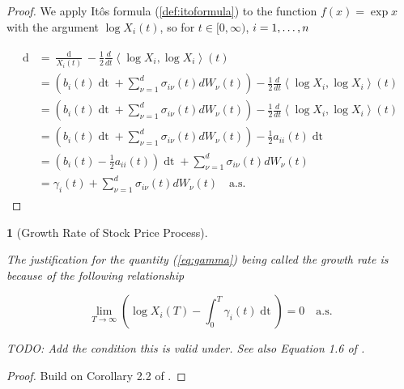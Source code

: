 \documentclass[british]{amsart}
\numberwithin{equation}{section}
\numberwithin{figure}{section}
\theoremstyle{plain}
\newtheorem{thm}{\protect\theoremname}[section]
\theoremstyle{definition}
\theoremstyle{plain}
\theoremstyle{plain}
\theoremstyle{plain}
\theoremstyle{remark}
\theoremstyle{plain}
\providecommand{\theoremname}{Theorem}
\renewcommand{\d}[1]{\mathop{\mathrm{d}{#1}}}
\newcommand{\ranget}{t\in[0,\infty)}
\newcommand{\almostsurely}{\text{a.s.}}
\begin{document}
\begin{proof}
	We apply It\^{o}s formula (\ref{def:itoformula}) to the function $f(x)=\exp{x}$ with the argument $\log{X_{i}(t)}$, so for $\ranget$, $i=1,\dots,n$

	\begin{gather*}
		\begin{split}
			\d{\log{X_{i}(t)}} 
			 	& = 
					\frac{\d{X_{i}(t)}}{X_{i}(t)} - 
						\frac{1}{2} \frac{d}{dt}\left\langle \log X_{i},\log X_{i}\right\rangle(t)
					\\
				& = 
					\left(
						b_{i}(t)\d{t} + 
						\sum_{\nu=1}^{d} \sigma_{i\nu}(t) dW_{\nu}(t)
					\right)- 
					\frac{1}{2} \frac{d}{dt}\left\langle \log X_{i},\log X_{i}\right\rangle(t)
					\\
				& = 
					\left(
						b_{i}(t)\d{t} + 
						\sum_{\nu=1}^{d} \sigma_{i\nu}(t) dW_{\nu}(t)
					\right)- 
					\frac{1}{2} \frac{d}{dt}\left\langle \log X_{i},\log X_{i}\right\rangle(t)
					\\
				& = 
					\left(
						b_{i}(t)\d{t} + 
						\sum_{\nu=1}^{d} \sigma_{i\nu}(t) dW_{\nu}(t)
					\right)- 
					\frac{1}{2} a_{ii}(t)\d{t}
					\\
				& = 
					\left(
						b_{i}(t) -
						\frac{1}{2} a_{ii}(t)
					\right) \d{t} +
					\sum_{\nu=1}^{d} \sigma_{i\nu}(t) dW_{\nu}(t)
					\\
				& = 
					\gamma_{i}(t) +
					\sum_{\nu=1}^{d} \sigma_{i\nu}(t) dW_{\nu}(t)
				\quad \almostsurely
		\end{split}
	\end{gather*}

\end{proof}

\begin{thm} [Growth Rate of Stock Price Process]
	\label{thm:growthrate}

	The justification for the quantity (\ref{eq:gamma}) being called the 
	\textit{growth rate} is	because of the following relationship

	\begin{equation}
		\lim_{T \to \infty} 
			\left( 
			\log{X_{i}(T)} - \int_{0}^{T} \gamma_{i}(t)\d{t} 
			\right) = 0
		\quad \almostsurely
	\end{equation}

	TODO: Add the condition this is valid under.
	See also Equation 1.6 of \cite{fernholz2009}.

\end{thm}

\begin{proof}
	Build on Corollary 2.2 of \cite{fernholz1999}.
\end{proof}
\end{document}
